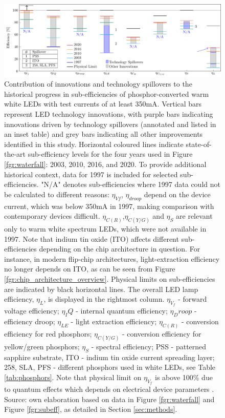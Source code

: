 \documentclass[twoside,twocolumn,9pt]{article}
\begin{document}
\begin{figure}[h!]
 \centering
 \includegraphics[width=\textwidth]{2_SSL_EES/article/figures/breakthroughs_efficiency.pdf}
 \caption{Contribution of innovations and technology spillovers to the historical progress in sub-efficiencies of phosphor-converted warm white LEDs with test currents of at least 350mA. Vertical bars represent LED technology innovations, with purple bars indicating innovations driven by technology spillovers (annotated and listed in an inset table) and grey bars indicating all other improvements identified in this study. Horizontal coloured lines indicate state-of-the-art sub-efficiency levels for the four years used in Figure \ref{fgr:waterfall}: 2003, 2010, 2016, and 2020. To provide additional historical context, data for 1997 is included for selected sub-efficiencies. "N/A" denotes sub-efficiencies where 1997 data could not be calculated to different reasons: $\eta_{Vf}$, $\eta_{droop}$ depend on the device current, which was below 350mA in 1997, making comparison with contemporary devices difficult. $\eta_{C(R)}$,$\eta_{C(Y/G)}$ and $\eta_S$ are relevant only to warm white spectrum LEDs, which were not available in 1997. Note that indium tin oxide (ITO) affects different sub-efficiencies depending on the chip architecture in question. For instance, in modern flip-chip architectures, light-extraction efficiency no longer depends on ITO, as can be seen from Figure \ref{fgr:chip_architecture_overview}. Physical limits on sub-efficiencies are indicated by black horizontal lines. The overall LED lamp efficiency, $\eta_L$, is displayed in the rightmost column. $\eta_{V_f}$ - forward voltage efficiency; $\eta_IQ$ - internal quantum efficiency; $\eta_Droop$ - efficiency droop; $\eta_{LE}$ - light extraction efficiency; $\eta_{C(R)}$ - conversion efficiency for red phosphors; $\eta_{C(Y/G)}$ - conversion efficiency for yellow/green phosphors; $\eta_S$ - spectral efficiency; PSS - patterned sapphire substrate, ITO - indium tin oxide current spreading layer; 258, SLA, PFS - different phosphors used in white LEDs, see Table \ref{tab:phosphors}.  Note that physical limit on $\eta_{V_f}$ is above 100\% due to quantum effects which depends on electrical device parameters \cite{david2016electrical}. Source: own elaboration based on data in Figure \ref{fgr:waterfall} and Figure \ref{fgr:subeff}, as detailed in Section \ref{sec:methods}.}
 \label{fgr:breakthroughs_efficiency}
\end{figure}
\end{document}
